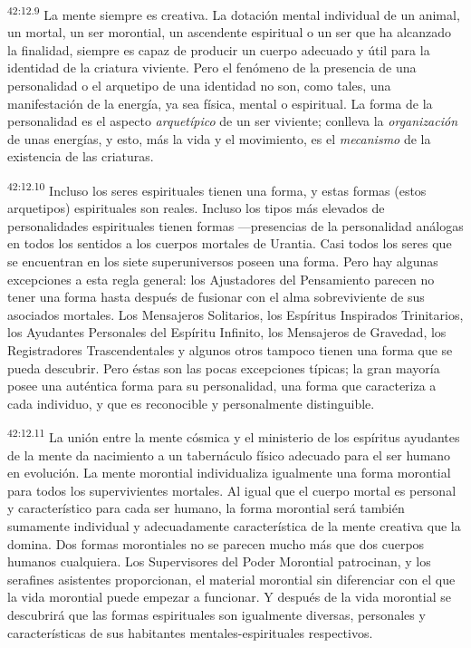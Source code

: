 \par
\textsuperscript{42:12.9} La mente siempre es creativa. La dotación mental individual de un animal, un mortal, un ser morontial, un ascendente espiritual o un ser que ha alcanzado la finalidad, siempre es capaz de producir un cuerpo adecuado y útil para la identidad de la criatura viviente. Pero el fenómeno de la presencia de una personalidad o el arquetipo de una identidad no son, como tales, una manifestación de la energía, ya sea física, mental o espiritual. La forma de la personalidad es el aspecto \textit{arquetípico} de un ser viviente; conlleva la \textit{organización} de unas energías, y esto, más la vida y el movimiento, es el \textit{mecanismo} de la existencia de las criaturas.

\par
\textsuperscript{42:12.10} Incluso los seres espirituales tienen una forma, y estas formas
(estos arquetipos) espirituales son reales. Incluso los tipos más elevados de personalidades espirituales tienen formas ---presencias de la personalidad análogas en todos los sentidos a los cuerpos mortales de Urantia. Casi todos los seres que se encuentran en los siete superuniversos poseen una forma. Pero hay algunas excepciones a esta regla general: los Ajustadores del Pensamiento parecen no tener una forma hasta después de fusionar con el alma sobreviviente de sus asociados mortales. Los Mensajeros Solitarios, los Espíritus Inspirados Trinitarios, los Ayudantes Personales del Espíritu Infinito, los Mensajeros de Gravedad, los Registradores Trascendentales y algunos otros tampoco tienen una forma que se pueda descubrir. Pero éstas son las pocas excepciones típicas; la gran mayoría posee una auténtica forma para su personalidad, una forma que caracteriza a cada individuo, y que es reconocible y personalmente distinguible.

\par
\textsuperscript{42:12.11} La unión entre la mente cósmica y el ministerio de los espíritus ayudantes de la mente da nacimiento a un tabernáculo físico adecuado para el ser humano en evolución. La mente morontial individualiza igualmente una forma morontial para todos los supervivientes mortales. Al igual que el cuerpo mortal es personal y característico para cada ser humano, la forma morontial será también sumamente individual y adecuadamente característica de la mente creativa que la domina. Dos formas morontiales no se parecen mucho más que dos cuerpos humanos cualquiera. Los Supervisores del Poder Morontial patrocinan, y los serafines asistentes proporcionan, el material morontial sin diferenciar con el que la vida morontial puede empezar a funcionar. Y después de la vida morontial se descubrirá que las formas espirituales son igualmente diversas, personales y características de sus habitantes mentales-espirituales respectivos.

